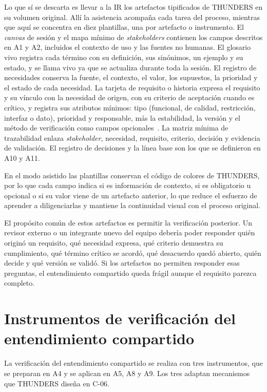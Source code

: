 \documentclass[12pt,letterpaper,oneside]{report}
\begin{document}
Lo que sí se descarta es llevar a la IR los artefactos tipificados de
THUNDERS en su volumen original. Allí la asistencia acompaña cada tarea del
proceso, mientras que aquí se concentra en diez plantillas, una por artefacto o
instrumento. El \textit{canvas} de sesión y el mapa mínimo de
\textit{stakeholders} contienen los campos descritos en A1 y A2, incluidos el
contexto de uso y las fuentes no humanas. El glosario vivo registra cada
término con su definición, sus sinónimos, un ejemplo y su estado, y se llama
vivo ya que se actualiza durante toda la sesión. El registro de necesidades
conserva la fuente, el contexto, el valor, los supuestos, la prioridad y el
estado de cada necesidad. La tarjeta de requisito o historia expresa el
requisito y su vínculo con la necesidad de origen, con su criterio de aceptación
cuando es crítico, y registra sus atributos mínimos: tipo (funcional, de
calidad, restricción, interfaz o dato), prioridad y responsable, más la
estabilidad, la versión y el método de verificación como campos
opcionales~\cite{iso29148}. La matriz mínima de trazabilidad enlaza
\textit{stakeholder}, necesidad, requisito, criterio, decisión y evidencia de
validación. El registro de decisiones y la línea base son los que se
definieron en A10 y A11.

En el modo asistido las plantillas conservan el código de colores de THUNDERS,
por lo que cada campo indica si es información de contexto, si es obligatorio u
opcional o si su valor viene de un artefacto anterior, lo que reduce el esfuerzo
de aprender a diligenciarlas y mantiene la continuidad visual con el proceso
original.

El propósito común de estos artefactos es permitir la verificación posterior.
Un revisor externo o un integrante nuevo del equipo debería poder responder
quién originó un requisito, qué necesidad expresa, qué criterio demuestra su
cumplimiento, qué término crítico se acordó, qué desacuerdo quedó abierto, quién
decide y qué versión se validó. Si los artefactos no permiten responder esas
preguntas, el entendimiento compartido queda frágil aunque el requisito parezca
completo.

\section{Instrumentos de verificación del entendimiento compartido}
\label{sec:instrumentos-v13}
La verificación del entendimiento compartido se realiza con tres instrumentos, que se
preparan en A4 y se aplican en A5, A8 y A9. Los tres adaptan mecanismos que
THUNDERS diseña en C-06.
\end{document}
